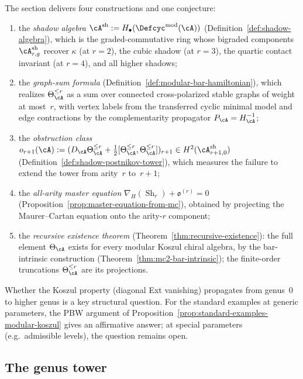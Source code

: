 The section delivers four constructions and one conjecture:
\begin{enumerate}[label=\textup{(\arabic*)}]
\item the \emph{shadow algebra}
  $\cA^{\mathrm{sh}} := H_\bullet(\Defcyc^{\mathrm{mod}}(\cA))$
  (Definition~\ref{def:shadow-algebra}), which is the
  graded-commutative ring whose bigraded components
  $\cA^{\mathrm{sh}}_{r,g}$ recover $\kappa$ (at $r{=}2$),
  the cubic shadow (at $r{=}3$), the quartic contact invariant
  (at $r{=}4$), and all higher shadows;
\item the \emph{graph-sum formula}
  (Definition~\ref{def:modular-bar-hamiltonian}), which realizes
  $\Theta_\cA^{\leq r}$ as a sum over connected cross-polarized
  stable graphs of weight at most~$r$, with vertex labels from the
  transferred cyclic minimal model and edge contractions by the
  complementarity propagator $P_\cA = H_\cA^{-1}$;
\item the \emph{obstruction class}
  $o_{r+1}(\cA) :=
  (D_\cA\Theta_\cA^{\leq r}
  + \tfrac12[\Theta_\cA^{\leq r},\Theta_\cA^{\leq r}])_{r+1}
  \in H^2(\cA^{\mathrm{sh}}_{r+1,0})$
  (Definition~\ref{def:shadow-postnikov-tower}), which measures
  the failure to extend the tower from arity~$r$ to~$r{+}1$;
\item the \emph{all-arity master equation}
  $\nabla_H(\operatorname{Sh}_r) + \mathfrak{o}^{(r)} = 0$
  (Proposition~\ref{prop:master-equation-from-mc}), obtained by
  projecting the Maurer--Cartan equation onto the
  arity-$r$ component;
\item the \emph{recursive existence theorem}
  (Theorem~\ref{thm:recursive-existence}): the full
  element
  $\Theta_\cA$ exists for
  every modular Koszul chiral algebra, by the bar-intrinsic
  construction (Theorem~\ref{thm:mc2-bar-intrinsic}); the
  finite-order truncations $\Theta_\cA^{\leq r}$ are its
  projections.
\end{enumerate}
Whether the Koszul property (diagonal Ext vanishing) propagates
from genus~$0$ to higher genus is a key structural question.
For the standard examples at generic parameters, the PBW argument of
Proposition~\ref{prop:standard-examples-modular-koszul} gives an
affirmative answer; at special parameters (e.g.\ admissible levels),
the question remains open.

\subsection{The genus tower}

